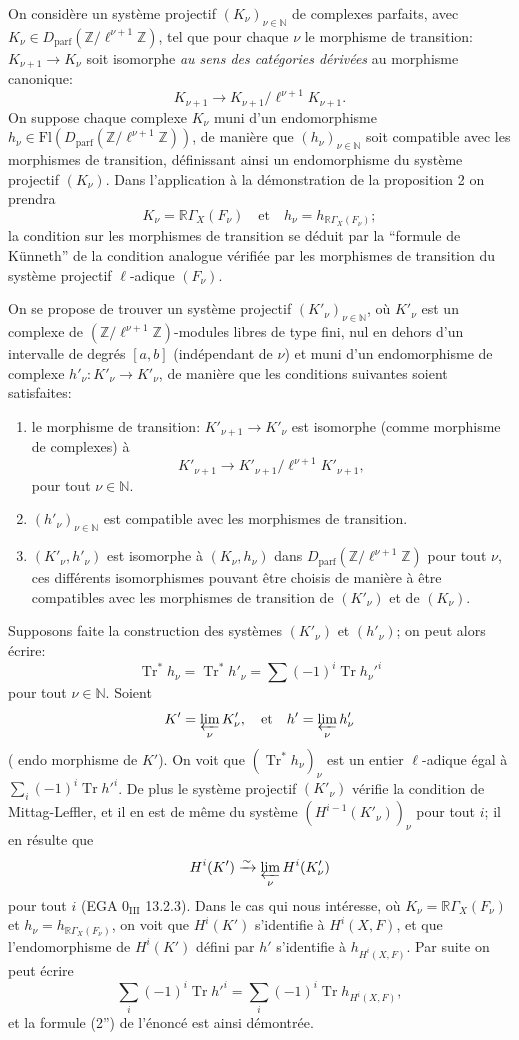 \documentclass[11pt]{article}
\newcommand{\R}{\mathbb{R}}\newcommand{\RHomCore}{\mathbb{R}\mathrm{Hom}}
\providecommand{\Tr}{\operatorname{Tr}}
\providecommand{\Tr}{\operatorname{Tr}}
\providecommand{\Tr}{\operatorname{Tr}}
\providecommand{\R}{\mathrm R}
\providecommand{\Tr}{\operatorname{Tr}}
\providecommand{\Tr}{\operatorname{Tr}}
\begin{document}
On considère un système projectif $(K_\nu)_{\nu\in\mathbb N}$ de complexes parfaits, avec $K_\nu\in D_{\mathrm{parf}}(\mathbb Z/\ell^{\nu+1}\mathbb Z)$, tel que pour chaque $\nu$ le
morphisme de transition: $K_{\nu+1}\to K_\nu$ soit isomorphe \emph{au sens des catégories dérivées} au morphisme canonique:
\[
K_{\nu+1}\to K_{\nu+1}/\ell^{\nu+1}K_{\nu+1}.
\]
On suppose chaque complexe $K_\nu$ muni d'un endomorphisme $h_\nu\in\mathrm{Fl}(D_{\mathrm{parf}}(\mathbb Z/\ell^{\nu+1}\mathbb Z))$, de manière que $(h_\nu)_{\nu\in\mathbb N}$ soit compatible avec les morphismes de transition, définissant ainsi un endomorphisme du système projectif $(K_\nu)$. Dans l'application à la démonstration de la proposition 2 on prendra
\[
K_\nu=\R\Gamma_X(F_\nu)\quad\text{et}\quad h_\nu=h_{\R\Gamma_X(F_\nu)};
\]
la condition sur les morphismes de transition se déduit par la ``formule de Künneth'' de la condition analogue vérifiée par les morphismes de transition du système projectif $\ell$-adique $(F_\nu)$.

On se propose de trouver un système projectif $(K'_\nu)_{\nu\in\mathbb N}$, où $K'_\nu$ est un complexe de $(\mathbb Z/\ell^{\nu+1}\mathbb Z)$-modules libres de type fini, nul en dehors d'un intervalle de degrés $[a,b]$ (indépendant de $\nu$) et muni d'un endomorphisme de complexe $h'_\nu:K'_\nu\to K'_\nu$, de manière que les conditions suivantes soient satisfaites:
\begin{enumerate}[label=\arabic*)]
\item le morphisme de transition: $K'_{\nu+1}\to K'_\nu$ est isomorphe (comme morphisme de complexes) à
\[
K'_{\nu+1}\to K'_{\nu+1}/\ell^{\nu+1}K'_{\nu+1},
\]
pour tout $\nu\in\mathbb N$.
\item $(h'_\nu)_{\nu\in\mathbb N}$ est compatible avec les morphismes de transition.
\item $(K'_\nu,h'_\nu)$ est isomorphe à $(K_\nu,h_\nu)$ dans $D_{\mathrm{parf}}(\mathbb Z/\ell^{\nu+1}\mathbb Z)$ pour tout $\nu$, ces différents isomorphismes pouvant être choisis de manière à être compatibles avec les morphismes de transition de $(K'_\nu)$ et de $(K_\nu)$.
\end{enumerate}
Supposons faite la construction des systèmes $(K'_\nu)$ et $(h'_\nu)$; on peut alors écrire:
\[
\Tr^*h_\nu=\Tr^*h'_\nu=\sum(-1)^i\Tr h_\nu'^i
\]
pour tout $\nu\in\mathbb N$. Soient
\[
K'=\varprojlim_\nu K'_\nu,
\quad\text{et}\quad h'=\varprojlim_\nu h'_\nu
\]
(
endo%
morphisme de $K'$). On voit que $(\Tr^*h_\nu)_\nu$ est un entier $\ell$-adique égal à $\sum_i(-1)^i\Tr h'^i$. De plus le système projectif $(K'_\nu)$ vérifie la condition de Mittag-Leffler, et il en est de même du système $(H^{i-1}(K'_\nu))_\nu$ pour tout $i$; il en résulte que
\[
H^i(K')\xrightarrow{\sim}\varprojlim_\nu H^i(K'_\nu)
\]
pour tout $i$ (EGA $0_{\mathrm{III}}$ 13.2.3). Dans le cas qui nous intéresse, où $K_\nu=\R\Gamma_X(F_\nu)$ et $h_\nu=h_{\R\Gamma_X(F_\nu)}$, on voit que $H^i(K')$ s'identifie à $H^i(X,F)$, et que l'endomorphisme de $H^i(K')$ défini par $h'$ s'identifie à $h_{H^i(X,F)}$. Par suite on peut écrire
\[
\sum_i(-1)^i\Tr h'^i=
\sum_i(-1)^i\Tr h_{H^i(X,F)},
\]
et la formule (2'') de l'énoncé est ainsi démontrée.
\end{document}
